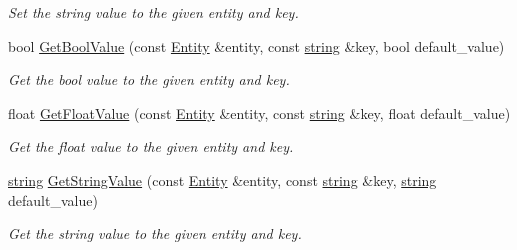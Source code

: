 \begin{DoxyCompactItemize}
\begin{DoxyCompactList}\small\item\em Set the string value to the given entity and key. \end{DoxyCompactList}\item 
bool \hyperlink{class_ensum_1_1_components_1_1_data_manager_adfe67760f896d060535ca824b9e30136}{Get\+Bool\+Value} (const \hyperlink{struct_ensum_1_1_components_1_1_entity}{Entity} \&entity, const \hyperlink{class_ensum_1_1string}{string} \&key, bool default\+\_\+value)\hypertarget{class_ensum_1_1_components_1_1_data_manager_adfe67760f896d060535ca824b9e30136}{}\label{class_ensum_1_1_components_1_1_data_manager_adfe67760f896d060535ca824b9e30136}

\begin{DoxyCompactList}\small\item\em Get the bool value to the given entity and key. \end{DoxyCompactList}\item 
float \hyperlink{class_ensum_1_1_components_1_1_data_manager_a07f4059308f838e2e0cfaffaf34c5e39}{Get\+Float\+Value} (const \hyperlink{struct_ensum_1_1_components_1_1_entity}{Entity} \&entity, const \hyperlink{class_ensum_1_1string}{string} \&key, float default\+\_\+value)\hypertarget{class_ensum_1_1_components_1_1_data_manager_a07f4059308f838e2e0cfaffaf34c5e39}{}\label{class_ensum_1_1_components_1_1_data_manager_a07f4059308f838e2e0cfaffaf34c5e39}

\begin{DoxyCompactList}\small\item\em Get the float value to the given entity and key. \end{DoxyCompactList}\item 
\hyperlink{class_ensum_1_1string}{string} \hyperlink{class_ensum_1_1_components_1_1_data_manager_a2e887a0aed7af4a9e34a9f37ff7ae021}{Get\+String\+Value} (const \hyperlink{struct_ensum_1_1_components_1_1_entity}{Entity} \&entity, const \hyperlink{class_ensum_1_1string}{string} \&key, \hyperlink{class_ensum_1_1string}{string} default\+\_\+value)\hypertarget{class_ensum_1_1_components_1_1_data_manager_a2e887a0aed7af4a9e34a9f37ff7ae021}{}\label{class_ensum_1_1_components_1_1_data_manager_a2e887a0aed7af4a9e34a9f37ff7ae021}

\begin{DoxyCompactList}\small\item\em Get the string value to the given entity and key. \end{DoxyCompactList}\end{DoxyCompactItemize}
